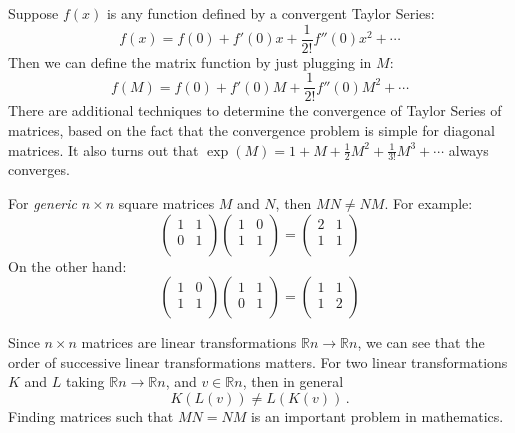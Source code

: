 Suppose $f(x)$ is any function defined by a convergent Taylor Series:
\[
f(x) = f(0) + f'(0)x + \frac{1}{2!}f''(0)x^2 + \cdots
\]
Then we can define the matrix function by just plugging in $M$:
\[
f(M) = f(0) + f'(0)M + \frac{1}{2!}f''(0)M^2 + \cdots
\]
There are additional techniques to determine the convergence of Taylor Series of matrices, based on the fact that the convergence problem is simple for diagonal matrices.  It also turns out that $\exp (M) = 1 + M + \frac{1}{2}M^2 + \frac{1}{3!}M^3 + \cdots$ always converges.


\begin{remark}

For {\itshape generic} $n\times n$ square matrices $M$ and $N$, then $MN\neq NM$.  For example:
\[
\begin{pmatrix}
1 & 1 \\
0 & 1 \\
\end{pmatrix}
\begin{pmatrix}
1 & 0 \\
1 & 1 \\
\end{pmatrix} =
\begin{pmatrix}
2 & 1 \\
1 & 1 \\
\end{pmatrix}
\]
On the other hand:
\[
\begin{pmatrix}
1 & 0 \\
1 & 1 \\
\end{pmatrix}
\begin{pmatrix}
1 & 1 \\
0 & 1 \\
\end{pmatrix} =
\begin{pmatrix}
1 & 1 \\
1 & 2 \\
\end{pmatrix}
\]

Since $n\times n$ matrices are linear transformations $\mathbb{R}n \rightarrow \mathbb{R}n$, we can see that the order of successive linear transformations matters.  For two linear transformations $K$ and $L$ taking $\mathbb{R}n \rightarrow \mathbb{R}n$, and $v\in \mathbb{R}n$, then in general \[K(L(v)) \neq L(K(v))\, .\]
Finding matrices such that $MN=NM$ is an important problem in mathematics.
\end{remark}

